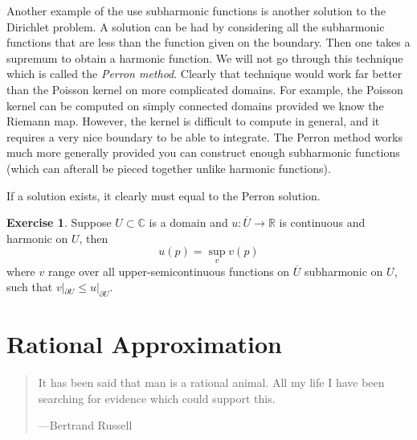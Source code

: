 \documentclass[12pt,openany]{book}
\newcommand{\C}{{\mathbb{C}}}
\newcommand{\R}{{\mathbb{R}}}
\newcommand{\myindex}[1]{#1\index{#1}}
\theoremstyle{plain}
\theoremstyle{remark}
\theoremstyle{definition}
\newenvironment{exbox}{%
    \def\FrameCommand{\vrule width 1pt \relax\hspace {10pt}}%
    \MakeFramed {\advance \hsize -\width \FrameRestore }%
}{%
    \endMakeFramed
}
\newenvironment{myquote}{%
    \begin{quote}%
    \begingroup\itshape
}{%
    \endgroup%
    \end{quote}
}
\theoremstyle{exercise}
\newtheorem{exercise}{Exercise}[section]
\theoremstyle{example}
\begin{document}
Another example of the use subharmonic functions is another solution
to the Dirichlet problem.  A solution can be had by considering all the
subharmonic functions that are less than the function given on the boundary.
Then one takes a supremum to obtain a harmonic function.  We will not go
through this technique which is called the \emph{\myindex{Perron method}}.
Clearly that technique would work far better than the Poisson kernel on
more complicated domains.  For example, the Poisson kernel can be computed
on simply connected domains provided we know the Riemann map.  However,
the kernel is difficult to compute in general, and it requires a very nice
boundary to be able to integrate.  The Perron method works much more
generally provided you can construct enough subharmonic functions (which can
afterall be pieced together unlike harmonic functions).

If a solution exists, it clearly must equal to the Perron solution.

\begin{exbox}
\begin{exercise}
Suppose $U \subset \C$ is a domain and
$u \colon \overline{U} \to \R$ is continuous and
harmonic on $U$, then
\begin{equation*}
u(p) = \sup_{v} v(p)
\end{equation*}
where $v$ range over all upper-semicontinuous functions on $\overline{U}$
subharmonic on $U$,
such that $v|_{\partial U} \leq u|_{\partial U}$.
\end{exercise}
\end{exbox}


\chapter{Rational Approximation} \label{ch:runge}

\begin{myquote}
It has been said that man is a rational animal. All my life I have been searching for evidence which could support this.

---Bertrand Russell
\end{myquote}

\end{document}
